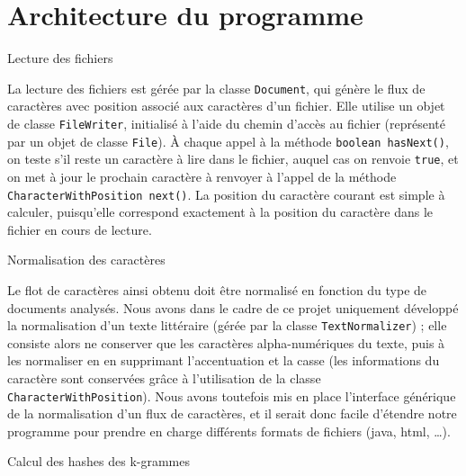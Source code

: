 \documentclass[a4paper,twoside,12pt]{article}
\newcounter{partie}
\newcounter{sous-partie}
\newenvironment{partie}[1]
{
\section{#1}
}
{

}
\newenvironment{sous-partie}[1]
{
\subsection{#1}
}
{

}
\begin{document}
\begin{partie}{Architecture du programme}
\begin{sous-partie}{Lecture des fichiers}

\begin{paragraph}{}
La lecture des fichiers est gérée par la classe \texttt{Document}, qui génère le flux de caractères avec position associé aux caractères d'un fichier. Elle utilise un objet de classe \texttt{FileWriter}, initialisé à l'aide du chemin d'accès au fichier (représenté par un objet de classe \texttt{File}). À chaque appel à la méthode \texttt{boolean hasNext()}, on teste s'il reste un caractère à lire dans le fichier, auquel cas on renvoie \texttt{true}, et on met à jour le prochain caractère à renvoyer à l'appel de la méthode \texttt{CharacterWithPosition next()}. La position du caractère courant est simple à calculer, puisqu'elle correspond exactement à la position du caractère dans le fichier en cours de lecture.
\end{paragraph}

\end{sous-partie}

\begin{sous-partie}{Normalisation des caractères}
\label{norm}
\begin{paragraph}{}
Le flot de caractères ainsi obtenu doit être normalisé en fonction du type de documents analysés. Nous avons dans le cadre de ce projet uniquement développé la normalisation d'un texte littéraire (gérée par la classe \texttt{TextNormalizer}) ; elle consiste alors ne conserver que les caractères alpha-numériques du texte, puis à les normaliser en en supprimant l'accentuation et la casse (les informations du caractère sont conservées grâce à l'utilisation de la classe \texttt{CharacterWithPosition}). Nous avons toutefois mis en place l'interface générique de la normalisation d'un flux de caractères, et il serait donc facile d'étendre notre programme pour prendre en charge différents formats de fichiers (java, html, \dots).
\end{paragraph}
\end{sous-partie}

\begin{sous-partie}{Calcul des hashes des k-grammes}
\label{kgram}


\end{sous-partie}
\end{partie}
\end{document}
